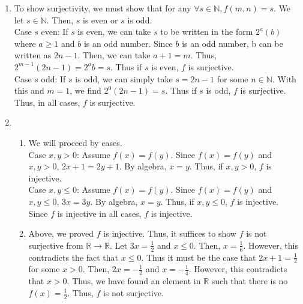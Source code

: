\documentclass[10pt]{exam}
\begin{document}
\newcommand{\dd}{\textrm{d}}
\newcommand{\NN}{\mathbb N}
\newcommand{\CC}{\mathbb C}
\newcommand{\QQ}{\mathbb Q}
\newcommand{\ZZ}{\mathbb Z}
\newcommand{\RR}{\mathbb R}
\newcommand{\proofdone}{\hfill $\square$}

\begin{enumerate}
    \item To show surjectivity, we must show that for any $\forall s\in \NN, f(m,n) = s$. 
    We let $s\in \NN$. Then, $s$ is even or $s$ is odd. \\
    Case $s$ even: 
    If $s$ is even, we can take $s$ to be written in the form $2^a(b)$ where $a\geq 1$ and 
    $b$ is an odd number. Since $b$ is an odd number, b can be written as $2n-1$. Then, 
    we can take $a+1 = m$. Thus, $2^{m-1}(2n-1) = 2^ab = s$. Thus if $s$ is even, $f$ is 
    surjective. \\

    Case $s$ odd: 
    If $s$ is odd, we can simply take $s = 2n-1$ for some $n\in \NN$. With this and 
    $m = 1$, we find $2^0(2n-1) = s$. Thus if $s$ is odd, $f$ is surjective. \\

    Thus, in all cases, $f$ is surjective. 

    \pagebreak

    \item 
    \begin{enumerate}
        \item 
        We will proceed by cases. \\
        Case $x, y > 0$: Assume $f(x) = f(y)$. Since $f(x) = f(y)$ and $x, y > 0$,
        $2x+1 = 2y+1$. By algebra, $x = y$. Thus, if $x, y > 0$, $f$ is injective. \\

        Case $x, y \leq 0$: Assume $f(x) = f(y)$. Since $f(x) = f(y)$ and $x, y \leq 0$,
        $3x = 3y$. By algebra, $x = y$. Thus, if $x, y \leq 0$, $f$ is injective.\\

        Since $f$ is injective in all cases, $f$ is injective.

        \item
        Above, we proved $f$ is injective. Thus, it suffices to show $f$ is not surjective
        from $\RR \rightarrow \RR$. Let $3x = \frac{1}{2}$ and $x\leq 0$. Then, 
        $x = \frac{1}{6}$. However, this contradicts the fact that $x\leq 0$. Thus 
        it must be the case that $2x+1 = \frac{1}{2}$ for some $x > 0$. Then, 
        $2x = -\frac{1}{2}$ and $x = -\frac{1}{4}$. However, this contradicts that 
        $x > 0$. Thus, we have found an element in $\RR$ such that there is no 
        $f(x) = \frac{1}{2}$. Thus, $f$ is not surjective. \\


\end{enumerate}
\end{enumerate}
\end{document}
